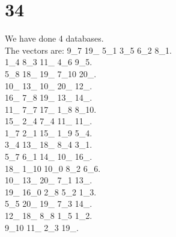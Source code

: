 \chapter{34}
\indent We have done 4 databases.\\
The vectors are:
9\_7 19\_ 5\_1 3\_5 6\_2 8\_1.\\1\_4 8\_3 11\_ 4\_6 9\_5.\\5\_8 18\_ 19\_ 7\_10 20\_.\\10\_ 13\_ 10\_ 20\_ 12\_.\\16\_ 7\_8 19\_ 13\_ 14\_.\\11\_ 7\_7 17\_ 1\_8 8\_10.\\15\_ 2\_4 7\_4 11\_ 11\_.\\1\_7 2\_1 15\_ 1\_9 5\_4.\\3\_4 13\_ 18\_ 8\_4 3\_1.\\5\_7 6\_1 14\_ 10\_ 16\_.\\18\_ 1\_10 10\_0 8\_2 6\_6.\\10\_ 13\_ 20\_ 7\_1 13\_.\\19\_ 16\_0 2\_8 5\_2 1\_3.\\5\_5 20\_ 19\_ 7\_3 14\_.\\12\_ 18\_ 8\_8 1\_5 1\_2.\\9\_10 11\_ 2\_3 19\_.\\